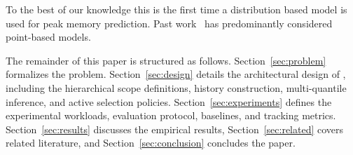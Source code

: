 To the best of our knowledge this is the first time a distribution based model is used for peak memory prediction. Past work~\cite{bader2024sizey} has predominantly considered point-based models. 


The remainder of this paper is structured as follows. Section~\ref{sec:problem} formalizes the problem. Section~\ref{sec:design} details the architectural design of \toolname{}, including the hierarchical scope definitions, history construction, multi-quantile inference, and active selection policies. Section~\ref{sec:experiments} defines the experimental workloads, evaluation protocol, baselines, and tracking metrics. Section~\ref{sec:results} discusses the empirical results, Section~\ref{sec:related} covers related literature, and Section~\ref{sec:conclusion} concludes the paper.
